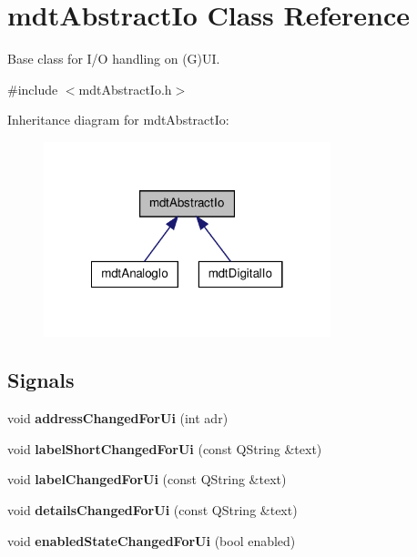\hypertarget{classmdt_abstract_io}{
\section{mdtAbstractIo Class Reference}
\label{classmdt_abstract_io}
}


Base class for I/O handling on (G)UI.  




{\ttfamily \#include $<$mdtAbstractIo.h$>$}



Inheritance diagram for mdtAbstractIo:\nopagebreak
\begin{figure}[H]
\begin{center}
\leavevmode
\includegraphics[width=236pt]{classmdt_abstract_io__inherit__graph}
\end{center}
\end{figure}
\subsection*{Signals}
\begin{DoxyCompactItemize}
\item 
\hypertarget{classmdt_abstract_io_a217c4fa4f4996a97f939d4066c88fffc}{
void {\bfseries addressChangedForUi} (int adr)}
\label{classmdt_abstract_io_a217c4fa4f4996a97f939d4066c88fffc}

\item 
\hypertarget{classmdt_abstract_io_aa12930a4316d7679668a07855c92e625}{
void {\bfseries labelShortChangedForUi} (const QString \&text)}
\label{classmdt_abstract_io_aa12930a4316d7679668a07855c92e625}

\item 
\hypertarget{classmdt_abstract_io_ab87859883a00193ac680c09cfef8dc84}{
void {\bfseries labelChangedForUi} (const QString \&text)}
\label{classmdt_abstract_io_ab87859883a00193ac680c09cfef8dc84}

\item 
\hypertarget{classmdt_abstract_io_aa6add53c265560420b70852ba490c2ff}{
void {\bfseries detailsChangedForUi} (const QString \&text)}
\label{classmdt_abstract_io_aa6add53c265560420b70852ba490c2ff}

\item 
\hypertarget{classmdt_abstract_io_a4406bc16e8decdb506b34d9ca679203e}{
void {\bfseries enabledStateChangedForUi} (bool enabled)}
\label{classmdt_abstract_io_a4406bc16e8decdb506b34d9ca679203e}

\end{DoxyCompactItemize}
